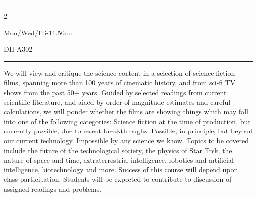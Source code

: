 \documentclass[11pt, a4paper]{article}
\begin{document}
 

\normalfont


  
\hrule     
\vspace{.5cm}

\begin{multicols}{2}
    \begin{description}[labelindent=0.00in,leftmargin=1.25in,rightmargin=0.0in,style=nextline]
		\item[\textsc{Instructor}:] \instructor
        \item[\textsc{E-mail}:] \email
        \item[] 
        \item[\textsc{Class Time}:] Mon/Wed/Fri-11:50am 
        \item[] 
        \item[\textsc{Office}:]  \office
        \item[\textsc{Office Hours}:] \hours
        \item[] 
        \item[\textsc{Class Room}:] DH A302
        \item[] 
    \end{description}
\end{multicols}
\hrule        
\vspace{.2cm}

\noindent We will view and critique the science content in a selection of
science fiction films, spanning more than 100 years of cinematic history, and
from sci-fi TV shows from the past 50+ years. Guided by selected readings from
current scientific literature, and aided by order-of-magnitude estimates and
careful calculations, we will ponder whether the films are showing things which
may fall into one of the following categories: Science fiction at the time of
production, but currently possible, due to recent breakthroughs. Possible, in
principle, but beyond our current technology. Impossible by any science we know.
Topics to be covered include the future of the technological society, the
physics of Star Trek, the nature of space and time, extraterrestrial
intelligence, robotics and artificial intelligence, biotechnology and more.
Success of this course will depend upon class participation. Students will be
expected to contribute to discussion of assigned readings and problems.
\end{document}
